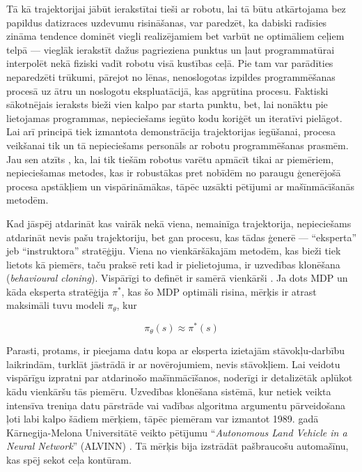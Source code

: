 \documentclass[12pt, a4paper]{article}
\numberwithin{equation}{section} %
\begin{document}
Tā kā trajektorijai jābūt ierakstītai tieši ar robotu, lai tā būtu atkārtojama bez papildus datizraces uzdevumu risināšanas, var paredzēt, ka dabiski radīsies zināma tendence dominēt viegli realizējamiem bet varbūt ne optimāliem ceļiem telpā --- vieglāk ierakstīt dažus pagrieziena punktus un ļaut programmatūrai interpolēt nekā fiziski vadīt robotu visā kustības ceļā. Pie tam var parādīties neparedzēti trūkumi, pārejot no lēnas, nenoslogotas izpildes programmēšanas procesā uz ātru un noslogotu ekspluatācijā, kas apgrūtina procesu. Faktiski sākotnējais ieraksts bieži vien kalpo par starta punktu, bet, lai nonāktu pie lietojamas programmas, nepieciešams iegūto kodu koriģēt un iteratīvi pielāgot. Lai arī principā tiek izmantota demonstrācija trajektorijas iegūšanai, procesa veikšanai tik un tā nepieciešams personāls ar robotu programmēšanas prasmēm. Jau sen atzīts \cite{muench1994robot,billard2008handbook}, ka, lai tik tiešām robotus varētu apmācīt tikai ar piemēriem, nepieciešamas metodes, kas ir robustākas pret nobīdēm no paraugu ģenerējošā procesa apstākļiem un vispārināmākas, tāpēc uzsākti pētījumi ar mašīnmācīšanās metodēm.

Kad jāspēj atdarināt kas vairāk nekā viena, nemainīga trajektorija, nepieciešams atdarināt nevis pašu trajektoriju, bet gan procesu, kas tādas ģenerē --- ``eksperta'' jeb ``instruktora'' stratēģiju. Viena no vienkāršākajām metodēm, kas bieži tiek lietots kā piemērs, taču praksē reti kad ir pielietojuma, ir uzvedības klonēšana (\textit{behavioural cloning}). Vispārīgi to definēt ir samērā vienkārši \cite{attia2018global}. Ja dots MDP un kāda eksperta stratēģija $\pi^*$, kas šo MDP optimāli risina, mērķis ir atrast maksimāli tuvu modeli $\pi_{\theta}$, kur

\begin{equation}
    \pi_{\theta}(s) \approx \pi^*(s)
\end{equation}

Parasti, protams, ir pieejama datu kopa ar eksperta izietajām stāvokļu-darbību laikrindām, turklāt jāstrādā ir ar novērojumiem, nevis stāvokļiem. Lai veidotu vispārīgu izpratni par atdarinošo mašīnmācīšanos, noderīgi ir detalizētāk aplūkot kādu vienkāršu tās piemēru. Uzvedības klonēšana sistēmā, kur netiek veikta intensīva treniņa datu pārstrāde vai vadības algoritma argumentu pārveidošana ļoti labi kalpo šādiem mērķiem, tāpēc piemēram var izmantot 1989. gadā Kārnegija-Melona Universitātē veikto pētījumu ``\textit{Autonomous Land Vehicle in a Neural Network}'' (ALVINN) \cite{pomerleau1989alvinn}. Tā mērķis bija izstrādāt pašbraucošu automašīnu, kas spēj sekot ceļa kontūram.
\end{document}
